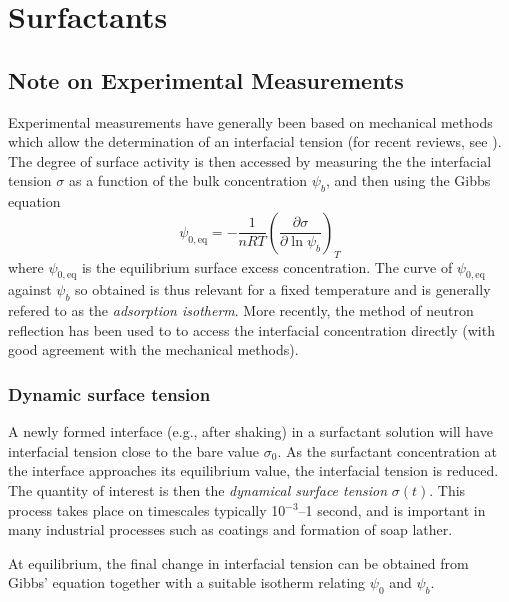 %
%
%

\section{Surfactants}

\subsection{Note on Experimental Measurements}

Experimental measurements have generally been based on mechanical
methods which allow the determination of an interfacial tension
(for recent reviews, see \cite{chang,eastoe}). The degree of surface
activity is then accessed by measuring the the interfacial tension
$\sigma$ as a function of the bulk concentration $\psi_b$, and then
using the Gibbs equation
\begin{equation}
\psi_{0,\mathrm{eq}} = -\frac{1}{nRT}
\left( \frac{\partial \sigma}{\partial \ln \psi_b} \right)_T
\end{equation}
where $\psi_{0,\mathrm{eq}}$ is the equilibrium surface excess
concentration. The curve of $\psi_{0,\mathrm{eq}}$ against $\psi_b$
so obtained is thus relevant for a fixed temperature and is generally
refered to as the \textit{adsorption isotherm}. More recently, the
method of neutron reflection has been used to to access the interfacial
concentration directly (with good agreement with the mechanical
methods).

\subsubsection{Dynamic surface tension}

A newly formed interface (e.g., after shaking) in a surfactant
solution will have interfacial tension close to the bare value
$\sigma_0$. As the surfactant concentration at the interface
approaches its equilibrium value, the interfacial tension is
reduced. The quantity of interest is then the \textit{dynamical
surface tension} $\sigma(t)$. This process takes place on
timescales typically 10$^{-3}$--1 second, and is important in
many industrial processes such as coatings and formation of
soap lather.

At equilibrium, the final change in interfacial tension can
be obtained from Gibbs' equation together with a suitable
isotherm relating $\psi_0$ and $\psi_b$. 

